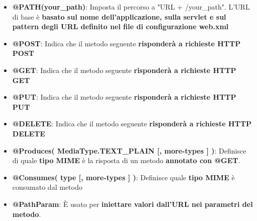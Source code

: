 \documentclass[12pt]{article}
\begin{document}
\begin{itemize}
    \item \textbf{@PATH(your\_path)}: Imposta il percorso a "URL + /your\_path". L'URL di base è \textbf{basato sul nome dell'applicazione, sulla servlet e sul pattern degli URL definito nel file di configurazione web.xml}
    \item \textbf{@POST}: Indica che il metodo seguente \textbf{risponderà a richieste HTTP POST}
    \item \textbf{@GET}: Indica che il metodo seguente \textbf{risponderà a richieste HTTP GET}
    \item \textbf{@PUT}: Indica che il metodo seguente \textbf{risponderà a richieste HTTP PUT}
    \item \textbf{@DELETE}: Indica che il metodo seguente \textbf{risponderà a richieste HTTP DELETE}
    \item \textbf{@Produces( MediaType.TEXT\_PLAIN [, more-types ] )}: Definisce di quale \textbf{tipo MIME} è la risposta di un metodo \textbf{annotato con @GET}.
    \item \textbf{@Consumes( type [, more-types ] )}: Definisce quale \textbf{tipo MIME} è consumato dal metodo
    \item \textbf{@PathParam}: È usato per \textbf{iniettare valori dall'URL nei parametri del metodo}.
\end{itemize}
\end{document}
